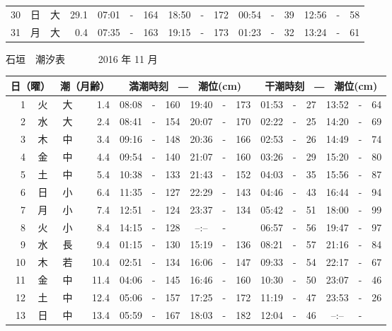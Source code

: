 \documentclass[12pt.a4j]{jsarticle}
\begin{document}
\begin{center}
\begin{table}[ht]
\begin{tabular}{|rc|cr|ccrccr|ccrccr|}
30 & 日 & 大 & 29.1 &  07:01 &-& 164  &  18:50 &-& 172  &   00:54 &-&  39  &   12:56 &-&  58  \\
31 & 月 & 大 &  0.4 &  07:35 &-& 163  &  19:15 &-& 173  &   01:23 &-&  32  &   13:24 &-&  61  \\
   \hline
   \end{tabular}
\end{table}
\newpage
 {\LARGE 石垣　潮汐表　　　}
 {\large 2016 年 11 月}\\
 \begin{table}[ht]
    \begin{tabular}{|rc|cr|ccrccr|ccrccr|}
    \hline
    \multicolumn{2}{|c|}{日（曜）} & \multicolumn{2}{c|}{潮（月齢）} & \multicolumn{6}{c|}{満潮時刻　―　潮位(cm)} & \multicolumn{6}{c|}{干潮時刻　―　潮位(cm)} \\
 \hline
 1 & 火 & 大 &  1.4 &  08:08 &-& 160  &  19:40 &-& 173  &   01:53 &-&  27  &   13:52 &-&  64  \\
 2 & 水 & 大 &  2.4 &  08:41 &-& 154  &  20:07 &-& 170  &   02:22 &-&  25  &   14:20 &-&  69  \\
 3 & 木 & 中 &  3.4 &  09:16 &-& 148  &  20:36 &-& 166  &   02:53 &-&  26  &   14:49 &-&  74  \\
 4 & 金 & 中 &  4.4 &  09:54 &-& 140  &  21:07 &-& 160  &   03:26 &-&  29  &   15:20 &-&  80  \\
 5 & 土 & 中 &  5.4 &  10:38 &-& 133  &  21:43 &-& 152  &   04:03 &-&  35  &   15:56 &-&  87  \\
 6 & 日 & 小 &  6.4 &  11:35 &-& 127  &  22:29 &-& 143  &   04:46 &-&  43  &   16:44 &-&  94  \\
 7 & 月 & 小 &  7.4 &  12:51 &-& 124  &  23:37 &-& 134  &   05:42 &-&  51  &   18:00 &-&  99  \\
 8 & 火 & 小 &  8.4 &  14:15 &-& 128  &  --:-- &-&     &   06:57 &-&  56  &   19:47 &-&  97  \\
 9 & 水 & 長 &  9.4 &  01:15 &-& 130  &  15:19 &-& 136  &   08:21 &-&  57  &   21:16 &-&  84  \\
10 & 木 & 若 & 10.4 &  02:51 &-& 134  &  16:06 &-& 147  &   09:33 &-&  54  &   22:17 &-&  67  \\
11 & 金 & 中 & 11.4 &  04:06 &-& 145  &  16:46 &-& 160  &   10:30 &-&  50  &   23:07 &-&  46  \\
12 & 土 & 中 & 12.4 &  05:06 &-& 157  &  17:25 &-& 172  &   11:19 &-&  47  &   23:53 &-&  26  \\
13 & 日 & 中 & 13.4 &  05:59 &-& 167  &  18:03 &-& 182  &   12:04 &-&  46  &   --:-- &-&     \\

\end{tabular}
\end{table}
\end{center}
\end{document}
